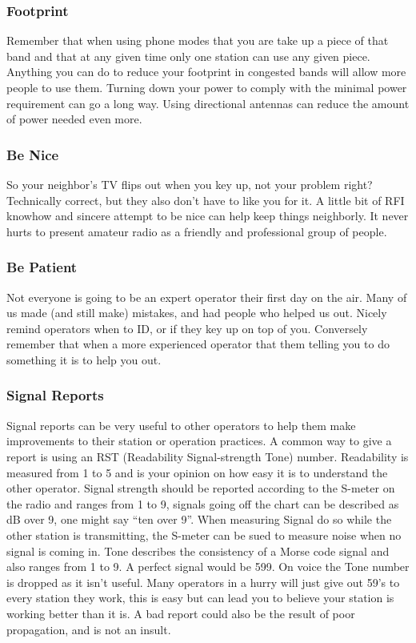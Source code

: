 \documentclass[10pt, handout]{beamer}
\begin{document}
\begin{frame}
\frametitle{Footprint}
Remember that when using phone modes that you are take up a piece of that band and that at any given time only one station can use any given piece. Anything you can do to reduce your footprint in congested bands will allow more people to use them. Turning down your power to comply with the minimal power requirement can go a long way. Using directional antennas can reduce the amount of power needed even more.
\end{frame}

\begin{frame}
\frametitle{Be Nice}
So your neighbor's TV flips out when you key up, not your problem right? Technically correct, but they also don't have to like you for it. A little bit of RFI knowhow and sincere attempt to be nice can help keep things neighborly. It never hurts to present amateur radio as a friendly and professional group of people.
\end{frame}

\begin{frame}
\frametitle{Be Patient}
Not everyone is going to be an expert operator their first day on the air. Many of us made (and still make) mistakes, and had people who helped us out. Nicely remind operators when to ID, or if they key up on top of you. Conversely remember that when a more experienced operator that them telling you to do something it is to help you out.
\end{frame}

\begin{frame}
\frametitle{Signal Reports}
Signal reports can be very useful to other operators to help them make improvements to their station or operation practices. A common way to give a report is using an RST (Readability Signal-strength Tone) number. Readability is measured from 1 to 5 and is your opinion on how easy it is to understand the other operator. Signal strength should be reported according to the S-meter on the radio and ranges from 1 to 9, signals going off the chart can be described as dB over 9, one might say ``ten over 9''. When measuring Signal do so while the other station is transmitting, the S-meter can be sued to measure noise when no signal is coming in. Tone describes the consistency of a Morse code signal and also ranges from 1 to 9. A perfect signal would be 599. On voice the Tone number is dropped as it isn't useful. Many operators in a hurry will just give out 59's to every station they work, this is easy but can lead you to believe your station is working better than it is. A bad report could also be the result of poor propagation, and is not an insult.
\end{frame}
\end{document}
